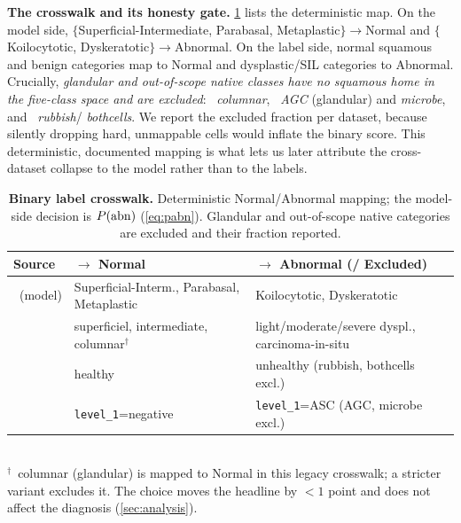 \noindent\textbf{The crosswalk and its honesty gate.} \cref{tab:mapping} lists the deterministic map.
On the model side, $\{$Superficial-Intermediate, Parabasal, Metaplastic$\}\!\to\!$Normal and
$\{$Koilocytotic, Dyskeratotic$\}\!\to\!$Abnormal. On the label side, normal squamous and benign
categories map to Normal and dysplastic/SIL categories to Abnormal. Crucially, \emph{glandular and
out-of-scope native classes have no squamous home in the five-class space and are excluded}: \herlev\
\emph{columnar}, \hicervix\ \emph{AGC} (glandular) and \emph{microbe}, and \apacc\ \emph{rubbish}/
\emph{bothcells}. We report the excluded fraction per dataset, because silently dropping hard,
unmappable cells would inflate the binary score. This deterministic, documented mapping is what lets
us later attribute the cross-dataset collapse to the model rather than to the labels.

\begin{table}[tb]
\caption{\textbf{Binary label crosswalk.} Deterministic Normal/Abnormal mapping; the model-side
decision is $P(\mathrm{abn})$ (\cref{eq:pabn}). Glandular and out-of-scope native categories are excluded and
their fraction reported.}
\label{tab:mapping}
\centering\small
\begin{tabular}{@{}lll@{}}
\toprule
Source & $\rightarrow$ Normal & $\rightarrow$ Abnormal \quad(/ Excluded) \\
\midrule
\sipakmed\ (model) & Superficial-Interm., Parabasal, Metaplastic & Koilocytotic, Dyskeratotic \\
\herlev & superficiel, intermediate, columnar$^\dagger$ & light/moderate/severe dyspl., carcinoma-in-situ \\
\apacc & healthy & unhealthy \quad(rubbish, bothcells excl.) \\
\hicervix & \texttt{level\_1}{=}negative & \texttt{level\_1}{=}ASC \quad(AGC, microbe excl.) \\
\bottomrule
\end{tabular}\\[2pt]
{\footnotesize $^\dagger$\herlev\ columnar (glandular) is mapped to Normal in this legacy crosswalk; a
stricter variant excludes it. The choice moves the headline by $<\!1$ point and does not affect the
diagnosis (\cref{sec:analysis}).}
\end{table}
